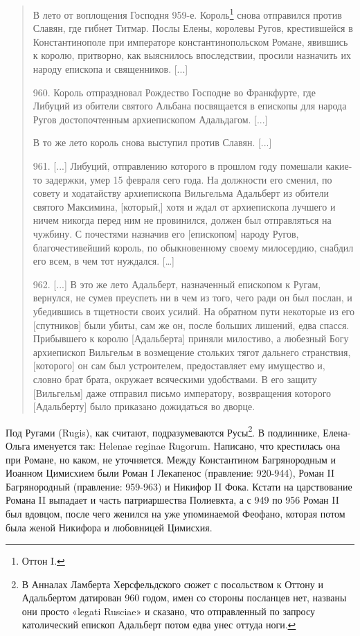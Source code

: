 \begin{quotation}
В лето от воплощения Господня 959-е. Король\footnote{Оттон I.} снова отправился против Славян, где гибнет Титмар. Послы Елены, королевы Ругов, крестившейся в Константинополе при императоре константинопольском Романе, явившись к королю, притворно, как выяснилось впоследствии, просили назначить их народу епископа и священников. [...]

960. Король отпраздновал Рождество Господне во Франкфурте, где Либуций из обители святого Альбана посвящается в епископы для народа Ругов достопочтенным архиепископом Адальдагом. [...]

В то же лето король снова выступил против Славян. [...]

961. [...] Либуций, отправлению которого в прошлом году помешали какие-то задержки, умер 15 февраля сего года. На должности его сменил, по совету и ходатайству архиепископа Вильгельма Адальберт из обители святого Максимина, [который,] хотя и ждал от архиепископа лучшего и ничем никогда перед ним не провинился, должен был отправляться на чужбину. С почестями назначив его [епископом] народу Ругов, благочестивейший король, по обыкновенному своему милосердию, снабдил его всем, в чем тот нуждался. […]

962. [...] В это же лето Адальберт, назначенный епископом к Ругам, вернулся, не сумев преуспеть ни в чем из того, чего ради он был послан, и убедившись в тщетности своих усилий. На обратном пути некоторые из его [спутников] были убиты, сам же он, после больших лишений, едва спасся. Прибывшего к королю [Адальберта] приняли милостиво, а любезный Богу архиепископ Вильгельм в возмещение стольких тягот дальнего странствия, [которого] он сам был устроителем, предоставляет ему имущество и, словно брат брата, окружает всяческими удобствами. В его защиту [Вильгельм] даже отправил письмо императору, возвращения которого [Адальберту] было приказано дожидаться во дворце.
\end{quotation}

Под Ругами (Rugis), как считают, подразумеваются Русы\footnote{В Анналах Ламберта Херсфельдского сюжет с посольством к Оттону и Адальбертом датирован 960 годом, имен со стороны посланцев нет, названы они просто «legati Rusciae» и сказано, что отправленный по запросу католический епископ Адальберт потом едва унес оттуда ноги.}. В подлиннике, Елена-Ольга именуется так: Helenae reginae Rugorum. Написано, что крестилась она при Романе, но каком, не уточняется. Между Константином Багрянородным и Иоанном Цимисхием были Роман I Лекапенос (правление: 920-944), Роман II Багрянородный (правление: 959-963) и Никифор II Фока. Кстати на царствование Романа II выпадает и часть патриаршества Полиевкта, а с 949 по 956 Роман II был вдовцом, после чего женился на уже упоминаемой Феофано, которая потом была женой Никифора и любовницей Цимисхия.


